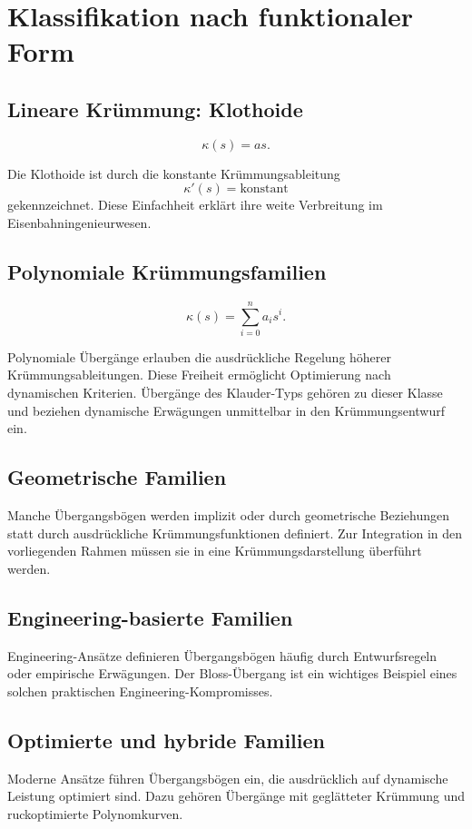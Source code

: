 \section{Klassifikation nach funktionaler Form}
\subsection{Lineare Krümmung: Klothoide}
\begin{definition}
\[
\kappa(s)=as.
\]
\end{definition}
Die Klothoide ist durch die konstante Krümmungsableitung
\[
\kappa'(s)=\text{konstant}
\]
gekennzeichnet. Diese Einfachheit erklärt ihre weite Verbreitung im
Eisenbahningenieurwesen.

\subsection{Polynomiale Krümmungsfamilien}
\begin{definition}
\[
\kappa(s)=\sum_{i=0}^{n}a_i s^i.
\]
\end{definition}
Polynomiale Übergänge erlauben die ausdrückliche Regelung höherer
Krümmungsableitungen. Diese Freiheit ermöglicht Optimierung nach dynamischen
Kriterien. Übergänge des Klauder-Typs gehören zu dieser Klasse und beziehen
dynamische Erwägungen unmittelbar in den Krümmungsentwurf ein.

\subsection{Geometrische Familien}
Manche Übergangsbögen werden implizit oder durch geometrische Beziehungen
statt durch ausdrückliche Krümmungsfunktionen definiert. Zur Integration in
den vorliegenden Rahmen müssen sie in eine Krümmungsdarstellung überführt
werden.

\subsection{Engineering-basierte Familien}
Engineering-Ansätze definieren Übergangsbögen häufig durch Entwurfsregeln oder
empirische Erwägungen. Der Bloss-Übergang ist ein wichtiges Beispiel eines
solchen praktischen Engineering-Kompromisses.

\subsection{Optimierte und hybride Familien}
Moderne Ansätze führen Übergangsbögen ein, die ausdrücklich auf dynamische
Leistung optimiert sind. Dazu gehören Übergänge mit geglätteter Krümmung und
ruckoptimierte Polynomkurven.

